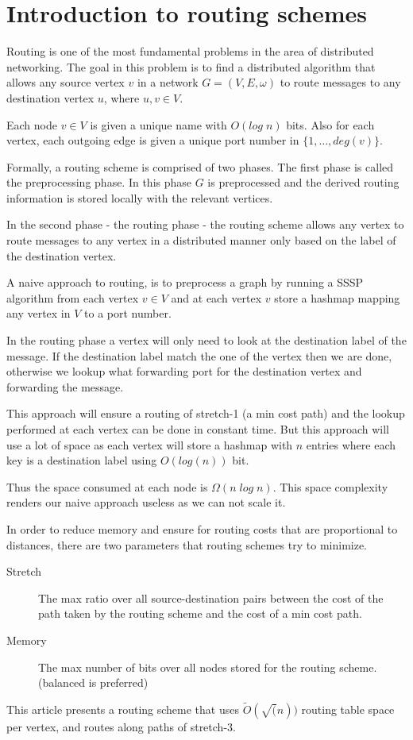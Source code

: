 \chapter{Introduction to routing schemes}

Routing is one of the most fundamental problems in the area of distributed
networking. The goal in this problem is to find a distributed algorithm that
allows any source vertex $v$ in a network $G=(V,E,\omega)$ to route messages
to any destination vertex $u$, where $u, v\in V$.

Each node $v \in V$ is given a unique name with $O(log\; n)$ bits. Also
for each vertex, each outgoing edge is given a unique port number in
$\{1,\dots,deg(v)\}$.

Formally, a routing scheme is comprised of two phases. The first phase is
called the preprocessing phase. In this phase $G$ is preprocessed and the
derived routing information is stored locally with the relevant vertices.

In the second phase - the routing phase - the routing scheme allows any vertex
to route messages to any vertex in a distributed manner only based on the
label of the destination vertex.

A naive approach to routing, is to preprocess a graph by running a SSSP
algorithm from each vertex $v \in V$ and at each vertex $v$ store a hashmap
mapping any vertex in $V$ to a port number.

In the routing phase a vertex will only need to look at the destination label
of the message. If the destination label match the one of the vertex then we
are done, otherwise we lookup what forwarding port for the destination vertex
and forwarding the message.

This approach will ensure a routing of stretch-1 (a min cost path) and the lookup performed at
each vertex can be done in constant time. But this approach will use a lot of
space as each vertex will store a hashmap with $n$ entries where each key is a
destination label using $O(log(n))$ bit.

Thus the space consumed at each node is $\Omega (n\; log\; n)$. This space
complexity renders our naive approach useless as we can not scale it.

In order to reduce memory and ensure for routing costs that are proportional
to distances, there are two parameters that routing schemes try to minimize.
\begin{description}
  \item[Stretch] The max ratio over all source-destination pairs between the
      cost of the path taken by the routing scheme and the cost of a min
      cost path.
  \item[Memory] The max number of bits over all nodes stored for the routing
      scheme. (balanced is preferred)
\end{description}
This article presents a routing scheme that uses $\tilde{O}(\sqrt(n))$
routing table space per vertex, and routes along paths of stretch-3.

